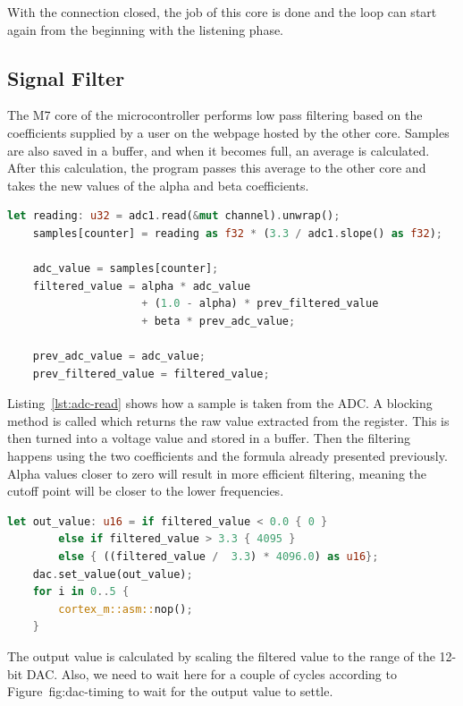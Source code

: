 With the connection closed, the job of this core is done and the loop can start again from the beginning with the listening phase.

\subsection{Signal Filter}

The M7 core of the microcontroller performs low pass filtering based on the coefficients supplied by a user on the webpage hosted by the other core. Samples are also saved in a buffer, and when it becomes full, an average is calculated. After this calculation, the program passes this average to the other core and takes the new values of the alpha and beta coefficients.

\begin{lstlisting}[language=Rust,frame=single,float=!ht,style=customrust,label={lst:adc-read},caption={Reading and Converting Input Voltage}]
    let reading: u32 = adc1.read(&mut channel).unwrap();
    samples[counter] = reading as f32 * (3.3 / adc1.slope() as f32);

    adc_value = samples[counter];
    filtered_value = alpha * adc_value
                     + (1.0 - alpha) * prev_filtered_value
                     + beta * prev_adc_value;

    prev_adc_value = adc_value;
    prev_filtered_value = filtered_value;
\end{lstlisting}

Listing~\ref{lst:adc-read} shows how a sample is taken from the ADC. A blocking  method is called which returns the raw value extracted from the register. This is then turned into a voltage value and stored in a buffer. Then the filtering happens using the two coefficients and the formula already presented previously. Alpha values closer to zero will result in more efficient filtering, meaning the cutoff point will be closer to the lower frequencies.

\begin{lstlisting}[language=Rust,frame=single,float=!ht,style=customrust,label={lst:dac-set},caption={Setting the DAC Output Value}]
    let out_value: u16 = if filtered_value < 0.0 { 0 }
        else if filtered_value > 3.3 { 4095 }
        else { ((filtered_value /  3.3) * 4096.0) as u16};
    dac.set_value(out_value);
    for i in 0..5 {
        cortex_m::asm::nop();
    }
\end{lstlisting}

The output value is calculated by scaling the filtered value to the range of the 12-bit DAC. Also, we need to wait here for a couple of cycles according to Figure~{fig:dac-timing} to wait for the output value to settle.

